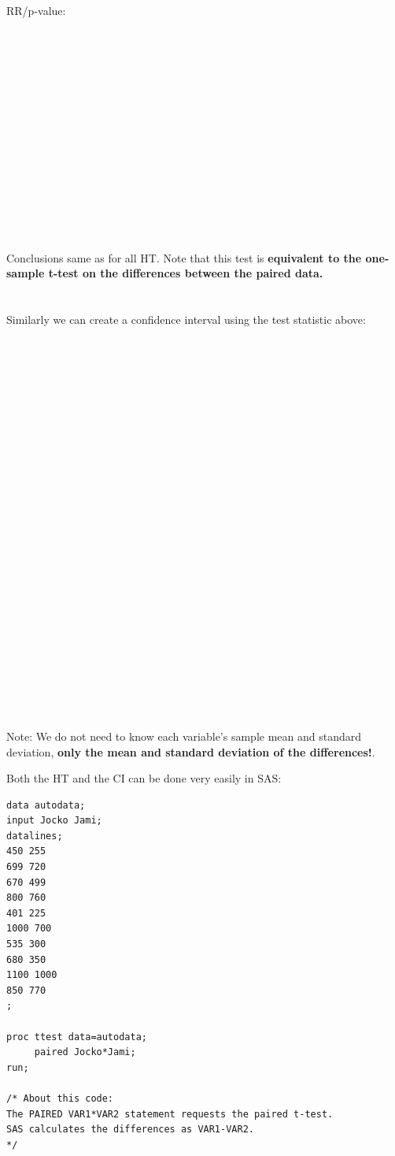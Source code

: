 \newpage

RR/p-value:\\~\\~\\~\\~\\~\\~\\~\\~\\~\\~\\~\\~\\~\\~\\~\\
Conclusions same as for all HT.  Note that this test is \textbf{equivalent to the one-sample t-test on the differences between the paired data.}\\~\\~\\

Similarly we can create a confidence interval using the test statistic above:
\\~\\~\\~\\~\\~\\~\\~\\~\\~\\~\\~\\~\\~\\~\\~\\~\\~\\~\\~\\~\\~\\~\\~\\~\\~\\~\\
Note:  We do not need to know each variable's sample mean and standard deviation, \textbf{only the mean and standard deviation of the differences!}.
\newpage

Both the HT and the CI can be done very easily in SAS:

\begin{verbatim}
data autodata;
input Jocko Jami;
datalines;
450 255
699 720
670 499
800 760
401 225
1000 700
535 300
680 350
1100 1000
850 770
;

proc ttest data=autodata; 
     paired Jocko*Jami;
run;

/* About this code:
The PAIRED VAR1*VAR2 statement requests the paired t-test. 
SAS calculates the differences as VAR1-VAR2. 
*/
\end{verbatim}

